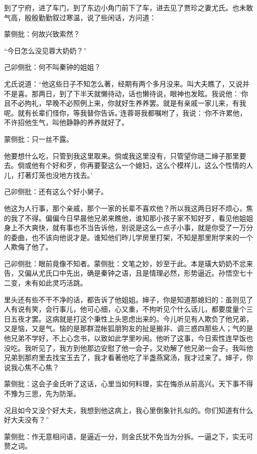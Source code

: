 \begin{parag}
    到了宁府，进了车门，到了东边小角门前下了车，进去见了贾珍之妻尤氏。也未敢气高，殷殷勤勤叙过寒温，说了些闲话，方问道：\begin{note}蒙侧批：何故兴致索然？\end{note}“今日怎么没见蓉大奶奶？”\begin{note}己卯侧批：何不叫秦钟的姐姐？\end{note}尤氏说道：“他这些日子不知怎么著，经期有两个多月没来。叫大夫瞧了，又说并不是喜。那两日，到了下半天就懒待动，话也懒待说，眼神也发眩。我说他：‘你且不必拘礼，早晚不必照例上来，你就好生养养罢。就是有亲戚一家儿来，有我呢。就有长辈们怪你，等我替你告诉。’连蓉哥我都嘱咐了，我说：‘你不许累他，不许招他生气，叫他静静的养养就好了。\begin{note}蒙侧批：只一丝不露。\end{note}他要想什么吃，只管到我这里取来。倘或我这里没有，只管望你琏二婶子那里要去。倘或他有个好和歹，你再要娶这么一个媳妇，这么个模样儿，这么个性情的人儿，打著灯笼也没地方找去。’\begin{note}己卯侧批：还有这么个好小舅子。\end{note}他这为人行事，那个亲戚，那个一家的长辈不喜欢他？所以我这两日好不烦心，焦的我了不得。偏偏今日早晨他兄弟来瞧他，谁知那小孩子家不知好歹，看见他姐姐身上不大爽快，就有事也不当告诉他，别说是这么一点子小事，就是你受了一万分的委曲，也不该向他说才是。谁知他们昨儿学房里打架，不知是那里附学来的一个人欺侮了他了。\begin{note}己卯侧批：眼前竟像不知者。蒙侧批：文笔之妙，妙至于此。本是璜大奶奶不忿来告，又偏从尤氏口中先出，确是秦钟之语，且是情理必然，形势逼近。孙悟空七十二变，未有如此灵巧活跳。\end{note}里头还有些不干不净的话，都告诉了他姐姐。婶子，你是知道那媳妇的：虽则见了人有说有笑，会行事儿，他可心细，心又重，不拘听见个什么话儿，都要度量个三日五夜才罢。这病就是打这个秉性上头思虑出来的。今儿听见有人欺负了他兄弟，又是恼，又是气。恼的是那群混帐狐朋狗友的扯是搬非、调三惑四那些人；气的是他兄弟不学好，不上心念书，以致如此学里吵闹。他听了这事，今日索性连早饭也没吃。我听见了，我方到他那边安慰了他一会子，又劝解了他兄弟一会子。我叫他兄弟到那府里去找宝玉去了，我才看著他吃了半盏燕窝汤，我才过来了。婶子，你说我心焦不心焦？\begin{note}蒙侧批：这会子金氏听了这话，心里当如何料理，实在悔杀从前高兴。天下事不得不豫为三思，先为防渐。\end{note}况且如今又没个好大夫，我想到他这病上，我心里倒象针扎似的。你们知道有什么好大夫没有？”\begin{note}蒙侧批：作无意相问语，是逼近一分，则金氏犹不免当为分拆。一逼之下，实无可赘之词。\end{note}
\end{parag}


